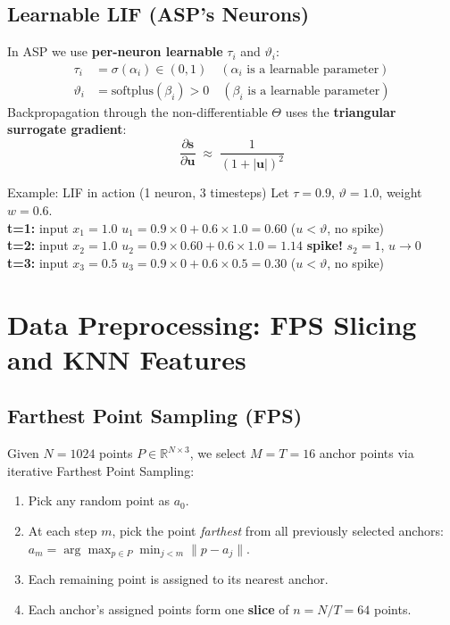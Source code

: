 \documentclass[11pt,a4paper]{article}
\begin{document}
\subsection{Learnable LIF (ASP's Neurons)}

In ASP we use \textbf{per-neuron learnable} $\tau_i$ and $\vartheta_i$:
\begin{align}
  \tau_i &= \sigma(\alpha_i) \in (0, 1)
    \quad (\alpha_i\text{ is a learnable parameter})\\
  \vartheta_i &= \text{softplus}(\beta_i) > 0
    \quad (\beta_i\text{ is a learnable parameter})
\end{align}
Backpropagation through the non-differentiable $\Theta$ uses the
\textbf{triangular surrogate gradient}:
\[
  \frac{\partial \mathbf{s}}{\partial \mathbf{u}} \;\approx\; \frac{1}{(1 + |\mathbf{u}|)^2}
\]

\begin{examplebox}{Example: LIF in action (1 neuron, 3 timesteps)}
Let $\tau=0.9$, $\vartheta=1.0$, weight $w=0.6$.\\[4pt]
\textbf{t=1:} input $x_1=1.0$
\quad $u_1 = 0.9 \times 0 + 0.6 \times 1.0 = 0.60$ \quad ($u < \vartheta$, no spike)\\
\textbf{t=2:} input $x_2=1.0$
\quad $u_2 = 0.9 \times 0.60 + 0.6 \times 1.0 = 1.14$ \quad \textbf{spike!} $s_2=1$, $u \to 0$\\
\textbf{t=3:} input $x_3=0.5$
\quad $u_3 = 0.9 \times 0 + 0.6 \times 0.5 = 0.30$ \quad ($u < \vartheta$, no spike)
\end{examplebox}

\section{Data Preprocessing: FPS Slicing and KNN Features}

\subsection{Farthest Point Sampling (FPS)}

Given $N=1024$ points $P \in \mathbb{R}^{N \times 3}$, we select $M=T=16$
anchor points via iterative Farthest Point Sampling:
\begin{enumerate}
  \item Pick any random point as $a_0$.
  \item At each step $m$, pick the point \emph{farthest} from all previously
        selected anchors: $a_m = \arg\max_{p \in P} \min_{j<m} \|p - a_j\|$.
  \item Each remaining point is assigned to its nearest anchor.
  \item Each anchor's assigned points form one \textbf{slice} of $n = N/T = 64$ points.
\end{enumerate}
\end{document}
